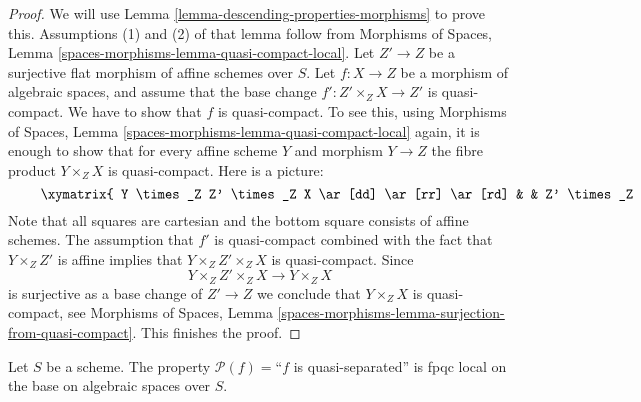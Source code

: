 \begin{proof}
We will use
Lemma \ref{lemma-descending-properties-morphisms}
to prove this. Assumptions (1) and (2) of that lemma follow from
Morphisms of Spaces,
Lemma \ref{spaces-morphisms-lemma-quasi-compact-local}.
Let $Z' \to Z$ be a surjective flat morphism of affine schemes over $S$.
Let $f : X \to Z$ be a morphism of algebraic spaces, and assume
that the base change $f' : Z' \times_Z X \to Z'$ is quasi-compact. We have
to show that $f$ is quasi-compact. To see this, using
Morphisms of Spaces,
Lemma \ref{spaces-morphisms-lemma-quasi-compact-local}
again, it is enough to show that for every affine scheme $Y$ and
morphism $Y \to Z$ the fibre product $Y \times_Z X$ is quasi-compact.
Here is a picture:
\begin{equation}
\label{equation-cube}
\vcenter{
\xymatrix{
Y \times_Z Z' \times_Z X \ar[dd] \ar[rr] \ar[rd] & &
Z' \times_Z X \ar'[d][dd]^{f'} \ar[rd] \\
& Y \times_Z X \ar[dd] \ar[rr] & & X \ar[dd]^f \\
Y \times_Z Z' \ar'[r][rr] \ar[rd] & & Z' \ar[rd] \\
& Y \ar[rr] & & Z
}
}
\end{equation}
Note that all squares are cartesian and the bottom square consists
of affine schemes. The assumption that $f'$ is quasi-compact combined with
the fact that $Y \times_Z Z'$ is affine implies that
$Y \times_Z Z' \times_Z X$ is quasi-compact. Since
$$
Y \times_Z Z' \times_Z X \longrightarrow Y \times_Z X
$$
is surjective as a base change of $Z' \to Z$
we conclude that $Y \times_Z X$ is quasi-compact, see
Morphisms of Spaces,
Lemma \ref{spaces-morphisms-lemma-surjection-from-quasi-compact}.
This finishes the proof.
\end{proof}

\begin{lemma}
\label{lemma-descending-property-quasi-separated}
Let $S$ be a scheme.
The property $\mathcal{P}(f) =$``$f$ is quasi-separated''
is fpqc local on the base on algebraic spaces over $S$.
\end{lemma}

